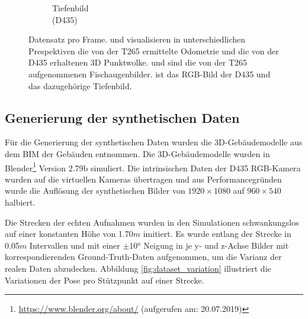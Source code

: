 \begin{figure}
\begin{subfigure}[t]{0.3\linewidth}
		\caption{Tiefenbild \\ (D435) \hspace*{2cm}}
		\label{subfig:depth-image}
	\end{subfigure}
	\caption{Datensatz pro Frame.   und  visualisieren in unterschiedlichen Prespektiven die von der T265 ermittelte Odometrie und die von der D435 erhaltenen 3D Punktwolke.  und  sind die von der T265 aufgenommenen Fischaugenbilder.  ist das RGB-Bild der D435 und  das dazugehörige Tiefenbild. }
	\label{fig:dataset}
\end{figure}

\subsection{Generierung der synthetischen Daten}
\label{subsec:generate_synth_images}
Für die Generierung der synthetischen Daten wurden die 3D-Gebäudemodelle  aus dem BIM der Gebäuden entnommen. Die 3D-Gebäudemodelle wurden in Blender\footnote{\url{https://www.blender.org/about/} (aufgerufen am: 20.07.2019)} Version 2.79b simuliert. Die intrinsischen Daten der D435 RGB-Kamera wurden auf die virtuellen Kameras übertragen und aus Performancegründen wurde die Auflösung der synthetischen Bilder von $1920\times1080$ auf  $960\times540$ halbiert.

Die Strecken der echten Aufnahmen wurden in den Simulationen schwankungslos auf einer konstanten Höhe von 1.70$m$ imitiert. Es wurde entlang der Strecke in 0.05$m$ Intervallen und mit einer $\pm$10° Neigung in je y- und z-Achse Bilder mit korrespondierenden Ground-Truth-Daten aufgenommen, um die Varianz der realen Daten abzudecken. Abbildung \ref{fig:dataset_variation} illustriert die Variationen der Pose pro Stützpunkt auf einer Strecke.


